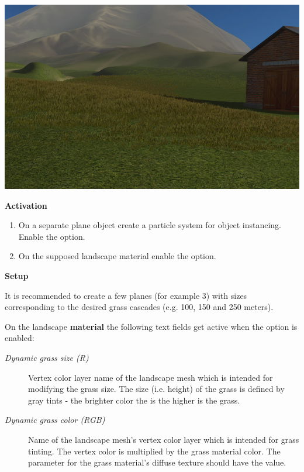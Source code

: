 \documentclass[a4paper,12pt,oneside]{sphinxmanual}
\begin{document}
{\hfill\includegraphics[width=1.000\linewidth]{dynamic_grass.jpg}\hfill}

\begin{DUlineblock}{0em}
\item[] 
\end{DUlineblock}

\textbf{Activation}
\begin{enumerate}
\item {} 
On a separate plane object create a particle system for object instancing. Enable the  option.

\item {} 
On the supposed landscape material enable the  option.

\end{enumerate}

\textbf{Setup}

It is recommended to create a few planes (for example 3) with sizes corresponding to the desired grass cascades (e.g. 100, 150 and 250 meters).

On the landscape \textbf{material} the following text fields get active when the  option is enabled:
\begin{description}
\item[{\emph{Dynamic grass size (R)}}] \leavevmode
Vertex color layer name of the landscape mesh which is intended for modifying the grass size. The size (i.e. height) of the grass is defined by gray tints - the brighter color the is the higher is the grass.

\item[{\emph{Dynamic grass color (RGB)}}] \leavevmode
Name of the landscape mesh's vertex color layer which is intended for grass tinting. The vertex color is multiplied by the grass material color. The  parameter for the grass material's diffuse texture should have the  value.

\end{description}
\end{document}
